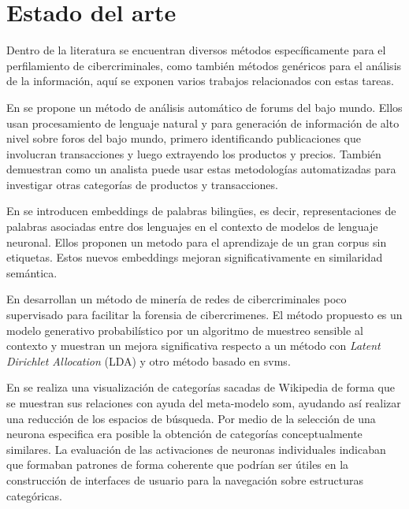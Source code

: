 \chapter{Estado del arte} %

\label{ch:StateOfTheArt} %


Dentro de la literatura se encuentran diversos métodos específicamente para el perfilamiento de cibercriminales, como también métodos genéricos para el análisis de la información, aquí se exponen varios trabajos relacionados con estas tareas.

En \cite{Portnoff2017} se propone un método de análisis automático de forums del bajo mundo. Ellos usan procesamiento de lenguaje natural y  para generación de información de alto nivel sobre foros del bajo mundo, primero identificando publicaciones que involucran transacciones y luego extrayendo los productos y precios. También demuestran como un analista puede usar estas metodologías automatizadas para investigar otras categorías de productos y transacciones.

En \cite{Zou2013} se introducen embeddings de palabras bilingües, es decir, representaciones de palabras asociadas entre dos lenguajes en el contexto de modelos de lenguaje neuronal. Ellos proponen un metodo para el aprendizaje de un gran corpus sin etiquetas. Estos nuevos embeddings mejoran significativamente en similaridad semántica.

En \cite{Lau2014} desarrollan un método de minería de redes de cibercriminales poco supervisado para facilitar la forensia de cibercrimenes. El método propuesto es un modelo generativo probabilístico por un algoritmo de muestreo sensible al contexto y muestran un mejora significativa respecto a un método con \emph{Latent Dirichlet Allocation} \textsc{(LDA)} y otro método basado en \glspl{svm}.

En \cite{som-vis-categories} se realiza una visualización de categorías sacadas de Wikipedia de forma que se muestran sus relaciones con ayuda del meta-modelo \gls{som}, ayudando así realizar una reducción de los espacios de búsqueda. Por medio de la selección de una neurona especifica era posible la obtención de categorías conceptualmente similares. La evaluación de las activaciones de neuronas individuales indicaban que formaban patrones de forma coherente que podrían ser útiles en la construcción de interfaces de usuario para la navegación sobre estructuras categóricas.


